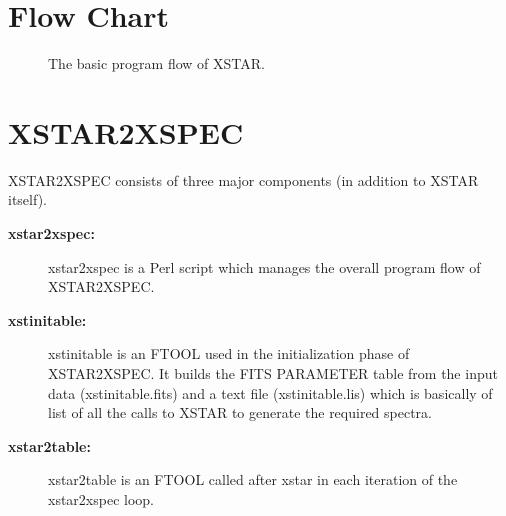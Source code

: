 \section {Flow Chart}

\begin{figure}
\epsfxsize=5.6in  %
\epsfysize=7.0in  %
\caption{The basic program flow of XSTAR.}
\label{fig:xstarflow}
\end{figure}





\section{XSTAR2XSPEC}

XSTAR2XSPEC consists of three major components (in addition to XSTAR 
itself).

\begin{description}
	\item[{\bf xstar2xspec:}] xstar2xspec is a Perl script which 
	manages the overall program flow of XSTAR2XSPEC.

	\item[{\bf xstinitable:}] xstinitable is an FTOOL used in the 
	initialization phase of XSTAR2XSPEC.  It builds the FITS PARAMETER 
	table from the input data (xstinitable.fits) and a text file 
	(xstinitable.lis) which is basically of list of all the calls to 
	XSTAR to generate the required spectra.

	\item[{\bf xstar2table:}] xstar2table is an FTOOL called after xstar in each 
	iteration of the xstar2xspec loop.
\end{description}

